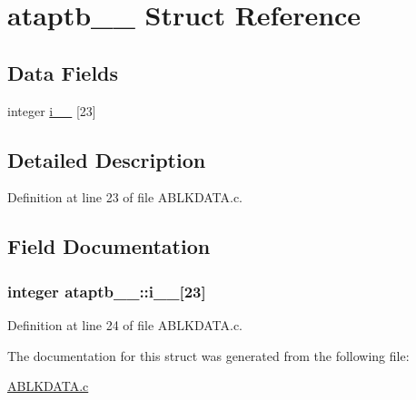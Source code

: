 \hypertarget{structataptb__1__}{}\section{ataptb\+\_\+\_\+ Struct Reference}
\label{structataptb__1__}
\subsection*{Data Fields}
\begin{DoxyCompactItemize}
\item 
integer \hyperlink{structataptb__1___a0554c820f0aee4e2513fb84cdaf38e26}{i\+\_\+\+\_\+} \mbox{[}23\mbox{]}
\end{DoxyCompactItemize}


\subsection{Detailed Description}


Definition at line 23 of file A\+B\+L\+K\+D\+A\+T\+A.\+c.



\subsection{Field Documentation}
\subsubsection[{\texorpdfstring{i\+\_\+\+\_\+}{i__}}]{\setlength{\rightskip}{0pt plus 5cm}integer ataptb\+\_\+\_\+\+::i\+\_\+\+\_\+\mbox{[}23\mbox{]}}\hypertarget{structataptb__1___a0554c820f0aee4e2513fb84cdaf38e26}{}\label{structataptb__1___a0554c820f0aee4e2513fb84cdaf38e26}


Definition at line 24 of file A\+B\+L\+K\+D\+A\+T\+A.\+c.



The documentation for this struct was generated from the following file\+:\begin{DoxyCompactItemize}
\item 
\hyperlink{ABLKDATA_8c}{A\+B\+L\+K\+D\+A\+T\+A.\+c}\end{DoxyCompactItemize}
